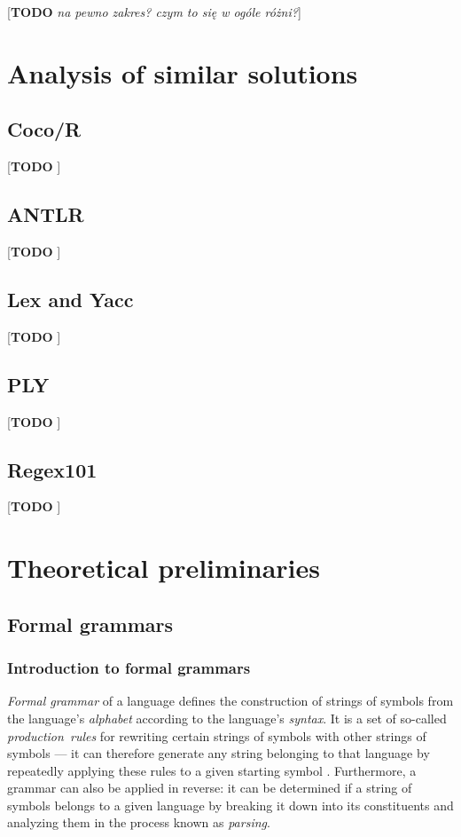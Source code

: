 \documentclass[english,engineering]{wizthesis}
\newcommand{\todo}[1]{{\color{red}[\textbf{TODO} \textit{#1}]}}
\begin{document}
\todo{na pewno zakres? czym to się w ogóle różni?}

\chapter{Analysis of similar solutions}

\section{Coco/R}

\todo{\cite{coco/r}}

\section{ANTLR}

\todo{\cite{antlr}}

\section{Lex and Yacc}

\todo{\cite{lex-yacc}}

\section{PLY}

\todo{\cite{ply}}

\section{Regex101}

\todo{\cite{regex101}}

\chapter{Theoretical preliminaries}

\section{Formal grammars}

\subsection{Introduction to formal grammars}

\textit{Formal grammar} of a language defines the construction of strings of
symbols from the language's \textit{alphabet} according to the language's
\textit{syntax}. It is a set of so-called \textit{production~rules} for
rewriting certain strings of symbols with other strings of symbols --- it can
therefore generate any string belonging to that language by repeatedly applying
these rules to a given starting symbol \cite{meduna-2014}. Furthermore, a
grammar can also be applied in reverse: it can be determined if a string of
symbols belongs to a given language by breaking it down into its constituents
and analyzing them in the process known as \textit{parsing}.
\end{document}
